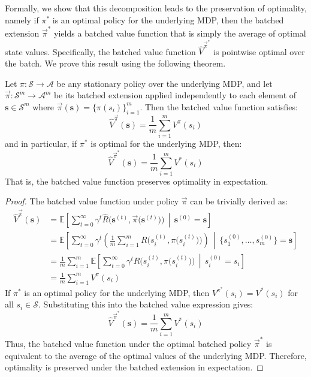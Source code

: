 Formally, we show that this decomposition leads to the preservation of optimality, namely if $\pi^*$ is an optimal policy for the underlying MDP, then the batched extension $\vec{\pi}^*$ yields a batched value function that is simply the average of optimal state values.
Specifically, the batched value function $\widehat{V}^{\vec{\pi}^*}$ is pointwise optimal over the batch.
We prove this result using the following theorem.

\begin{theorem}\label{thm:batched_value}
Let $\pi: \mathcal{S} \to \mathcal{A}$ be any stationary policy over the underlying MDP, and let $\vec{\pi}: \mathcal{S}^m \to \mathcal{A}^m$ be its batched extension applied independently to each element of $\mathbf{s} \in \mathcal{S}^m$ where $\vec{\pi}(\mathbf{s}) = \{ \pi(s_i) \}_{i=1}^m$. Then the batched value function satisfies:
\begin{equation}
    \widehat{V}^{\vec{\pi}}(\mathbf{s}) = \frac{1}{m} \sum_{i=1}^m V^\pi(s_i)
\end{equation}
and in particular, if $\pi^*$ is optimal for the underlying MDP, then:
\begin{equation}
    \widehat{V}^{\vec{\pi}^*}(\mathbf{s}) = \frac{1}{m} \sum_{i=1}^m V^*(s_i)
\end{equation}
That is, the batched value function preserves optimality in expectation.
\end{theorem}

\begin{proof}
The batched value function under policy $\vec{\pi}$ can be trivially derived as:
\begin{align}
    \widehat{V}^{\vec{\pi}}(\mathbf{s}) 
    &= \mathbb{E}\left[ \sum_{t=0}^\infty \gamma^t \widehat{R}\Big(\mathbf{s}^{(t)}, \vec{\pi}\big(\mathbf{s}^{(t)}\big)\Big) \,\middle|\, \mathbf{s}^{(0)} = \mathbf{s} \right] \\
    &= \mathbb{E}\left[ \sum_{t=0}^\infty \gamma^t \left( \frac{1}{m} \sum_{i=1}^m R\Big(s^{(t)}_i, \pi\big(s^{(t)}_i\big)\Big) \right) \,\middle|\, \big\{s^{(0)}_1, \ldots, s^{(0)}_m\big\} = \mathbf{s} \right] \\
    &= \frac{1}{m} \sum_{i=1}^m \mathbb{E}\left[ \sum_{t=0}^\infty \gamma^t R\Big(s^{(t)}_i, \pi\big(s^{(t)}_i\big)\Big) \,\middle|\, s^{(0)}_i = s_i \right] \\
    &= \frac{1}{m} \sum_{i=1}^m V^\pi(s_i)
\end{align}
If $\pi^*$ is an optimal policy for the underlying MDP, then $V^{\pi^*}(s_i) = V^*(s_i)$ for all $s_i \in \mathcal{S}$. Substituting this into the batched value expression gives:
\begin{equation}\label{eq:batched_value}
    \widehat{V}^{\vec{\pi}^*}(\mathbf{s}) = \frac{1}{m} \sum_{i=1}^m V^*(s_i)
\end{equation}
Thus, the batched value function under the optimal batched policy $\vec{\pi}^*$ is equivalent to the average of the optimal values of the underlying MDP.
Therefore, optimality is preserved under the batched extension in expectation.
\end{proof}

